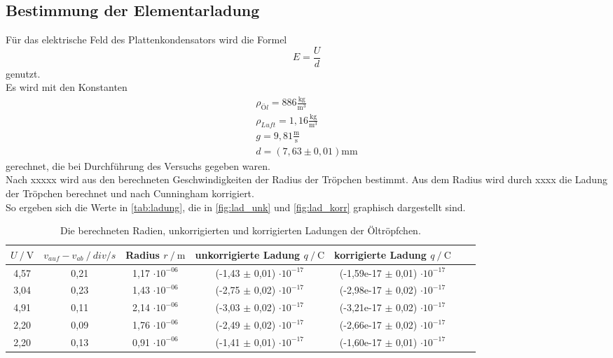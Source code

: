 \subsection*{Bestimmung der Elementarladung}

Für das elektrische Feld des Plattenkondensators wird die Formel
\begin{equation}
  E = \frac{U}{d}
\end{equation}
genutzt.\\
Es wird mit den Konstanten 
\begin{eqnarray}
  \rho_{Öl} = 886 \mathrm{\frac{kg}{m^3}}\\
  \rho_{Luft} = 1,16 \mathrm{\frac{kg}{m^3}}\\
  g = 9,81 \mathrm{\frac{m}{s}} \\
  d = (7,63 \pm 0,01) \mathrm{mm}
\end{eqnarray}
gerechnet, die bei Durchführung des Versuchs gegeben waren. \\

Nach xxxxx wird aus den berechneten Geschwindigkeiten der Radius
der Tröpchen bestimmt. Aus dem Radius wird durch xxxx die Ladung der Tröpchen berechnet und nach Cunningham korrigiert. \\
So ergeben sich die Werte in \autoref{tab:ladung}, die in \autoref{fig:lad_unk} und \autoref{fig:lad_korr} graphisch dargestellt sind.\\

\begin{table}[H]
  \centering
  \caption{Die berechneten Radien, unkorrigierten und korrigierten Ladungen der Öltröpfchen.}
  \begin{tabular}{ccccccc}
    \toprule
    {$U  \mathbin{/} \unit{\volt}$} &
    {$v_{auf} - v_{ab} \mathbin{/} \mathbin{div / s}$} &
    {Radius $r \mathbin{/} \unit{\metre} $} & %
    {unkorrigierte Ladung $q \mathbin{/} \unit{\coulomb}$} &
    {korrigierte Ladung $q \mathbin{/} \unit{\coulomb}$} \\
    \midrule
    4,57  & 0,21  &  1,17 $\cdot 10^{-06}$  &  (-1,43 $\pm$ 0,01) $\cdot 10^{-17}$  & (-1,59e-17 $\pm$ 0,01) $\cdot 10^{-17}$  \\
    3,04  & 0,23  &  1,43 $\cdot 10^{-06}$  &  (-2,75 $\pm$ 0,02) $\cdot 10^{-17}$ & (-2,98e-17 $\pm$ 0,02) $\cdot 10^{-17}$  \\
    4,91  & 0,11  &  2,14 $\cdot 10^{-06}$  &  (-3,03  $\pm$ 0,02) $\cdot 10^{-17}$   & (-3,21e-17  $\pm$ 0,02) $\cdot 10^{-17}$  \\
    2,20  & 0,09  &  1,76 $\cdot 10^{-06}$  &  (-2,49 $\pm$ 0,02) $\cdot 10^{-17}$  & (-2,66e-17  $\pm$ 0,02) $\cdot 10^{-17}$  \\
    2,20  & 0,13  &  0,91 $\cdot 10^{-06}$  &  (-1,41  $\pm$ 0,01) $\cdot 10^{-17}$    & (-1,60e-17  $\pm$ 0,01) $\cdot 10^{-17}$  \\
    \bottomrule
  \end{tabular}
  \label{tab:ladung}
\end{table}

